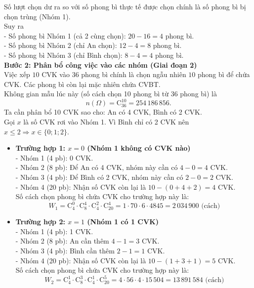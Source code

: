 \begin{ex}
{		Số lượt chọn dư ra so với số phong bì thực tế được chọn chính là số phong bì bị chọn trùng (Nhóm 1).\\
		Suy ra\\
		- Số phong bì Nhóm 1 (cả 2 cùng chọn): $20 - 16 = 4$ phong bì.\\
		- Số phong bì Nhóm 2 (chỉ An chọn): $12 - 4 = 8$ phong bì.\\
		- Số phong bì Nhóm 3 (chỉ Bình chọn): $8 - 4 = 4$ phong bì.\\
		\textbf{Bước 2: Phân bổ công việc vào các nhóm (Giai đoạn 2)}\\
		Việc xếp $10$ CVK vào $36$ phong bì chính là chọn ngẫu nhiên $10$ phong bì để chứa CVK. Các phong bì còn lại mặc nhiên chứa CVBT.\\
		Không gian mẫu lúc này (số cách chọn 10 phong bì từ 36 phong bì) là
		$$n(\Omega) = \mathrm{C}_{36}^{10} = 254\,186\,856.$$
		Ta cần phân bổ 10 CVK sao cho: An có 4 CVK, Bình có 2 CVK.\\
		Gọi $x$ là số CVK rơi vào Nhóm 1. Vì Bình chỉ có 2 CVK nên $x \le 2 \Rightarrow x \in \{0; 1; 2\}$.
		\begin{itemize}
			\item \textbf{Trường hợp 1: $x = 0$ (Nhóm 1 không có CVK nào)}\\
			- Nhóm 1 (4 pb): 0 CVK.\\
			- Nhóm 2 (8 pb): Để An có 4 CVK, nhóm này cần có $4 - 0 = 4$ CVK.\\
			- Nhóm 3 (4 pb): Để Bình có 2 CVK, nhóm này cần có $2 - 0 = 2$ CVK.\\
			- Nhóm 4 (20 pb): Nhận số CVK còn lại là $10 - (0+4+2) = 4$ CVK.\\
			Số cách chọn phong bì chứa CVK cho trường hợp này là:
			$$W_1 = \mathrm{C}_4^0 \cdot \mathrm{C}_8^4 \cdot \mathrm{C}_4^2 \cdot \mathrm{C}_{20}^4 = 1 \cdot 70 \cdot 6 \cdot 4845 = 2\,034\,900 \text{ (cách)}$$
			\item \textbf{Trường hợp 2: $x = 1$ (Nhóm 1 có 1 CVK)}\\
			- Nhóm 1 (4 pb): 1 CVK.\\
			- Nhóm 2 (8 pb): An cần thêm $4 - 1 = 3$ CVK.\\
			- Nhóm 3 (4 pb): Bình cần thêm $2 - 1 = 1$ CVK.\\
			- Nhóm 4 (20 pb): Nhận số CVK còn lại là $10 - (1+3+1) = 5$ CVK.\\
			Số cách chọn phong bì chứa CVK cho trường hợp này là:
			$$W_2 = \mathrm{C}_4^1 \cdot \mathrm{C}_8^3 \cdot \mathrm{C}_4^1 \cdot \mathrm{C}_{20}^5 = 4 \cdot 56 \cdot 4 \cdot 15\,504 = 13\,891\,584 \text{ (cách)}$$

\end{itemize}}
\end{ex}
